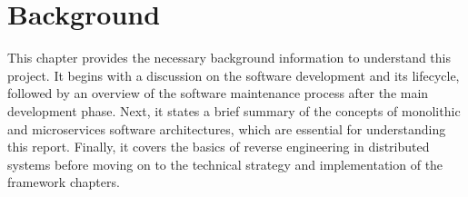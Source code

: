 \chapter{Background}\label{chap:background}

This chapter provides the necessary background information to understand this project. It begins with a discussion on the software development and its lifecycle, followed by an overview of the software maintenance process after the main development phase. Next, it states a brief summary of the concepts of monolithic and microservices software architectures, which are essential for understanding this report. Finally, it covers the basics of reverse engineering in distributed systems before moving on to the technical strategy and implementation of the framework chapters.